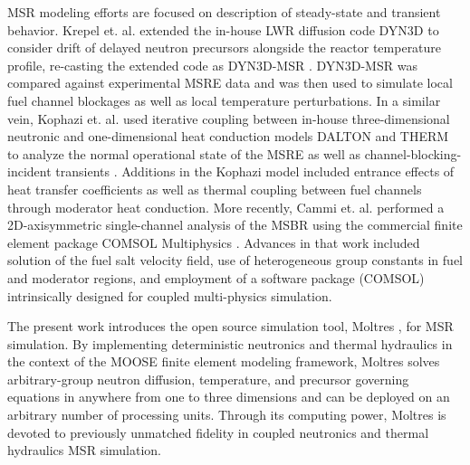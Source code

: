 \documentclass{article}
\begin{document}
\gls{MSR} modeling efforts are focused on description of steady-state and
transient behavior. Krepel et. al. extended the in-house \gls{LWR}
diffusion code DYN3D to consider drift of delayed neutron precursors alongside
the reactor temperature profile, re-casting the extended code as
DYN3D-MSR \cite{krepel_dyn3d-msr_2007}. DYN3D-MSR was compared against
experimental \gls{MSRE} data and was then used to simulate local fuel channel
blockages as well as local temperature perturbations. In a similar vein, Kophazi
et. al. used iterative coupling between in-house three-dimensional neutronic and
one-dimensional heat conduction models DALTON and THERM to analyze the normal
operational state of the \gls{MSRE} as well as channel-blocking-incident
transients \cite{kophazi_development_2009}. Additions in the Kophazi model
included entrance effects of heat transfer coefficients as well as thermal
coupling between fuel channels through moderator heat conduction. More recently,
Cammi et. al. performed a 2D-axisymmetric single-channel analysis of the
\gls{MSBR} using the commercial finite element package COMSOL
Multiphysics \cite{cammi_multi-physics_2011}. Advances in that work included
solution of the fuel salt velocity field, use of heterogeneous group constants
in fuel and moderator regions, and employment of a software package (COMSOL)
intrinsically designed for coupled multi-physics simulation.

The present work introduces the open source simulation tool, Moltres
\cite{lindsay_arfc/moltres_nodate}, for \gls{MSR} simulation.  By implementing
deterministic neutronics and thermal hydraulics in the context of the
\gls{MOOSE} finite element modeling framework, Moltres solves arbitrary-group
neutron diffusion, temperature, and precursor governing equations in anywhere
from one to three dimensions and can be deployed on an arbitrary number of
processing units. Through its computing power, Moltres is devoted to previously
unmatched fidelity in coupled neutronics and thermal hydraulics \gls{MSR}
simulation.
\end{document}
